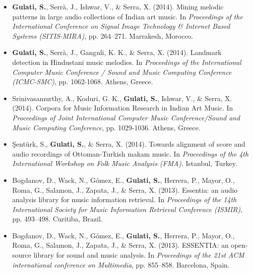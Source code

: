 \begin{itemize}[leftmargin=*]
	\item \textbf{Gulati, S.},  Serr{\`a}, J., Ishwar, V., \& Serra, X. (2014). Mining melodic patterns in large audio collections of Indian art music. In \textit{Proceedings of the International Conference on Signal Image Technology \& Internet Based Systems (SITIS-MIRA)}, pp. 264–271. Marrakesh, Morocco.
	\item \textbf{Gulati, S.}, Serr{\`a}, J., Ganguli, K. K., \& Serra, X. (2014). Landmark detection in Hindustani music melodies. In \textit{Proceedings of the International Computer Music Conference / Sound and Music Computing Conference (ICMC-SMC)}, pp. 1062-1068. Athens, Greece. 
	\item Srinivasamurthy, A., Koduri, G. K., \textbf{Gulati, S.}, Ishwar, V., \& Serra, X. (2014). Corpora for Music Information Research in Indian Art Music. In \textit{Proceedings of Joint International Computer Music Conference/Sound and Music Computing Conference}, pp. 1029-1036. Athens, Greece. 
	\item \c{S}ent{\"u}rk, S., \textbf{Gulati, S.}, \& Serra, X. (2014). Towards alignment of score and audio recordings of Ottoman-Turkish makam music. In \textit{Proceedings of the 4th International Workshop on Folk Music Analysis (FMA)}. Istanbul, Turkey. 
	\item Bogdanov, D., Wack, N., G{\'o}mez, E., \textbf{Gulati, S.}, Herrera, P., Mayor, O., Roma, G., Salamon, J., Zapata, J., \& Serra, X. (2013). Essentia: an audio analysis library for music information retrieval. In \textit{Proceedings of the 14th International Society for Music Information Retrieval Conference (ISMIR)}, pp. 493–498. Curitiba, Brazil.
	\item Bogdanov, D., Wack, N., G{\'o}mez, E., \textbf{Gulati, S.}, Herrera, P., Mayor, O., Roma, G., Salamon, J., Zapata, J., \& Serra, X. (2013). ESSENTIA: an open-source library for sound and music analysis. In \textit{Proceedings of the 21st ACM international conference on Multimedia}, pp. 855–858. Barcelona, Spain.

\end{itemize}
